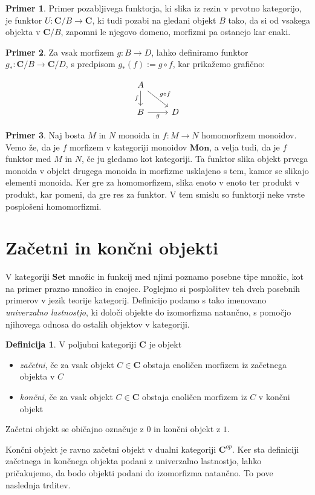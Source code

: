 \documentclass[12pt,a4paper]{book}
\theoremstyle{definition}
\newtheorem{definicija}{Definicija}[chapter]
\theoremstyle{plain}
\theoremstyle{definition}
\newtheorem{primer}{Primer}[section]
\theoremstyle{remark}
\newcommand{\cat}[1]{\textbf{#1}}
\begin{document}
\begin{primer}
Primer pozabljivega funktorja, ki slika iz rezin v prvotno kategorijo, je funktor $U : \cat{C}/B \to \cat{C}$, ki tudi pozabi na gledani objekt $B$ tako, da si od vsakega objekta v $\cat{C}/B$, zapomni le njegovo domeno, morfizmi pa ostanejo kar enaki.
\end{primer}

\begin{primer}
Za vsak morfizem $g : B \to D$, lahko definiramo funktor $g_* : \cat{C}/B \to \cat{C}/D$, s predpisom $g_*(f) := g \circ f$, kar prikažemo grafično:

$$\begin{tikzcd}
A \ar[d, "f"'] \ar[dr, "g \circ f"] & \\
B \ar[r, "g"'] & D
\end{tikzcd}$$

\end{primer}

\begin{primer}
Naj bosta $M$ in $N$ monoida in $f : M \to N$ homomorfizem monoidov. Vemo že, da je $f$ morfizem v kategoriji monoidov $\cat{Mon}$, a velja tudi, da je $f$ funktor med $M$ in $N$, če ju gledamo kot kategoriji. Ta funktor slika objekt prvega monoida v objekt drugega monoida in morfizme usklajeno s tem, kamor se slikajo elementi monoida. Ker gre za homomorfizem, slika enoto v enoto ter produkt v produkt, kar pomeni, da gre res za funktor. V tem smislu so funktorji neke vrste posplošeni homomorfizmi.
\end{primer}


\section{Začetni in končni objekti}
V kategoriji $\cat{Set}$ množic in funkcij med njimi poznamo posebne tipe množic, kot na primer prazno množico in enojec. Poglejmo si posplošitev teh dveh posebnih primerov v jezik teorije kategorij. Definicijo podamo s tako imenovano \emph{univerzalno lastnostjo}, ki določi objekte do izomorfizma natančno, s pomočjo njihovega odnosa do ostalih objektov v kategoriji.

\begin{definicija}
V poljubni kategoriji $\cat{C}$ je objekt
\begin{itemize}
\item \emph{začetni}, če za vsak objekt $C \in \cat{C}$ obstaja enoličen morfizem iz začetnega objekta v $C$
\item \emph{končni}, če za vsak objekt $C \in \cat{C}$ obstaja enoličen morfizem iz $C$ v končni objekt
\end{itemize}
Začetni objekt se običajno označuje z $0$ in končni objekt z $1$.
\end{definicija}
Končni objekt je ravno začetni objekt v dualni kategoriji $\cat{C}^{op}$. Ker sta definiciji začetnega in končnega objekta podani z univerzalno lastnostjo, lahko pričakujemo, da bodo objekti podani do izomorfizma natančno. To pove naslednja trditev.
\end{document}

